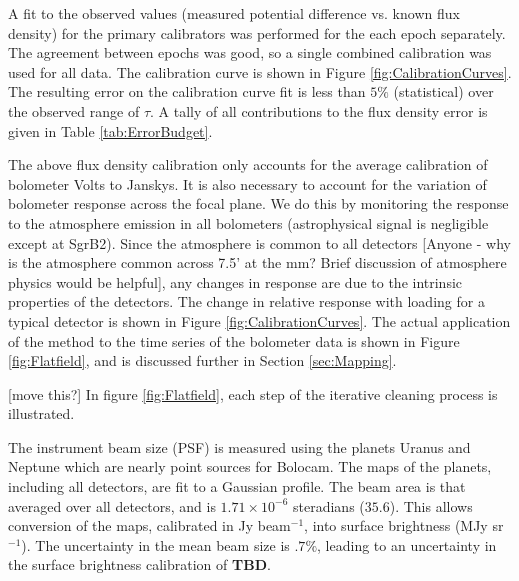 \documentclass[12pt,preprint]{aastex}
\newcommand{\Check}{{\bf ???}}
\newcommand{\bcamfwhm}{35.6\arcsec}
\newcommand{\TBD}{{\bf TBD}}
\begin{document}
%

A fit to the observed values (measured potential difference vs. known flux
density) for the primary calibrators was performed for the each epoch
separately.
The agreement between epochs was good, so a single combined
calibration was used for all data.
The calibration curve is shown in Figure \ref{fig:CalibrationCurves}.  The
resulting error on the calibration curve fit is less than 
$5\%$ (statistical) over the observed range of $\tau$.  A tally of all
contributions to the flux density error is given in Table
\ref{tab:ErrorBudget}.

The above flux density calibration only accounts for the average
calibration of bolometer Volts to Janskys.  It is also necessary to
account for the variation of bolometer response across the focal
plane.  We do this by monitoring the response to the atmosphere
emission in all bolometers (astrophysical signal is negligible except at SgrB2).  Since the
atmosphere is common to all detectors [Anyone - why is the atmosphere common across 7.5'
at the mm?  Brief discussion of atmosphere physics would be helpful], any changes in response are due to the
intrinsic properties of the detectors.  The change in relative response with
loading for a typical detector is shown in Figure \ref{fig:CalibrationCurves}.
The actual application of the method to the time series of the bolometer
data is shown in Figure \ref{fig:Flatfield}, and is discussed further in
Section \ref{sec:Mapping}.

[move this?] In figure \ref{fig:Flatfield}, each step of the iterative cleaning process is illustrated.

The instrument beam size (PSF) is measured using the planets Uranus
and Neptune which are nearly point sources for Bolocam.
The maps of the planets, including all detectors, are fit to a
Gaussian profile.  The beam area is that averaged over all detectors,
and is $1.71\times10^{-6}$ steradians ($35.6$\farcs).  This
allows conversion of the maps, calibrated in Jy beam$^{-1}$, into
surface brightness (MJy sr$^{-1}$).  The uncertainty in the mean beam size
is $.7\%$, leading to an uncertainty in the surface brightness calibration
of \TBD.
\end{document}
